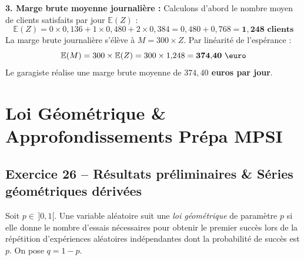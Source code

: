 \documentclass[11pt,a4paper]{article}
\newcommand{\E}{\mathbb{E}}
\begin{document}
\begin{correctionbox}[-- Modélisation conjointe \& Variable bivariée $Z = \min(X, Y)$]
\textbf{3. Marge brute moyenne journalière :}
Calculons d'abord le nombre moyen de clients satisfaits par jour $\E(Z)$ :
\[
\E(Z) = 0 \times 0{,}136 + 1 \times 0{,}480 + 2 \times 0{,}384 = 0{,}480 + 0{,}768 = \mathbf{1{,}248\text{ clients}}
\]
La marge brute journalière s'élève à $M = 300 \times Z$. Par linéarité de l'espérance :
\[
\E(M) = 300 \times \E(Z) = 300 \times 1{,}248 = \mathbf{374{,}40\text{ \euro}}
\]
Le garagiste réalise une marge brute moyenne de \textbf{$374{,}40$ euros par jour}.
\end{correctionbox}

\vspace{0.4cm}

\section{Loi Géométrique \& Approfondissements Prépa MPSI}

\subsection*{Exercice 26 -- Résultats préliminaires \& Séries géométriques dérivées}

Soit $p \in \,]0, 1[$. Une variable aléatoire suit une \emph{loi géométrique} de paramètre $p$ si elle donne le nombre d'essais nécessaires pour obtenir le premier succès lors de la répétition d'expériences aléatoires indépendantes dont la probabilité de succès est $p$. On pose $q = 1 - p$.
\end{document}

